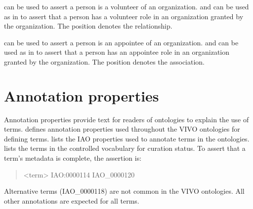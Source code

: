 \documentclass[letterpaper,10pt,english]{sphinxmanual}
\begin{document}
\sphinxAtStartPar
{} can be used to assert a person is a volunteer of an
organization.   and
 can be used as in {\hyperref[\detokenize{associations:figure-5}]{}} to assert
that a person has a volunteer role in an organization granted by the organization.
The position denotes the relationship.

\sphinxAtStartPar
{} can be used to assert a person is an appointee of an
organization.   and
 can be used as in {\hyperref[\detokenize{associations:figure-5}]{}} to assert
that a person has an appointee role in an organization granted by the organization.
The position denotes the association.


\chapter{Annotation properties}
\label{\detokenize{annotation-properties:annotation-properties}}\label{\detokenize{annotation-properties::doc}}
\sphinxAtStartPar
Annotation properties provide text for readers of ontologies to explain the
use of terms.   defines annotation properties used throughout the VIVO ontologies
for defining terms.  {\hyperref[\detokenize{classes:table-5}]{}} lists the IAO properties used to annotate terms in the
ontologies.  {\hyperref[\detokenize{annotation-properties:table-6}]{}} lists the terms in the controlled vocabulary for curation
status.  To assert that a term’s metadata is complete, the assertion is:
\begin{quote}

\sphinxAtStartPar
\textless{}term\textgreater{} IAO:0000114 IAO\_0000120
\end{quote}

\sphinxAtStartPar
Alternative terms (IAO\_0000118) are not common in the VIVO ontologies.  All other
annotations are expected for all terms.
\begin{quote}
\label{\detokenize{doc-IAO_0000111:iao-0000111}}\label{\detokenize{doc-IAO_0000111:editor-preferred-label}}\label{\detokenize{doc-IAO_0000111:iao-0000111}}
\ignorespaces \end{quote}
\end{document}
